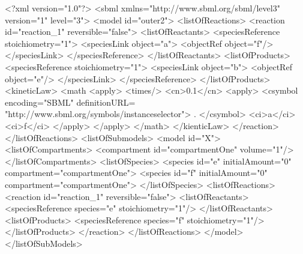 \documentclass{cekarticle}
\begin{document}
\begin{example}
<?xml version="1.0"?>
<sbml xmlns="http://www.sbml.org/sbml/level3" version="1" level="3">
    <model id="outer2">
        <listOfReactions>
            <reaction id="reaction_1" reversible="false">
                <listOfReactants>
                    <speciesReference stoichiometry="1">
                        <speciesLink object="a">
                            <objectRef object="f"/>
                        </speciesLink>
                    </speciesReference>
                </listOfReactants>
                <listOfProducts>
                    <speciesReference stoichiometry="1">
                        <speciesLink object="b">
                            <objectRef object="e"/>
                        </speciesLink>
                    </speciesReference>
                </listOfProducts>
                <kineticLaw>
                    <math 
                        <apply>
                            <times/>
                            <cn>0.1</cn>
                            <apply>
                                <csymbol
                                    encoding="SBML" 
                                    definitionURL=
                                        "http://www.sbml.org/symbols/instanceselector">
                                    .
                                </csymbol>
                                <ci>a</ci>
                                <ci>f</ci>
                            </apply>
                        </apply>    
                    </math>
                </kienticLaw>
            </reaction>
        </listOfReactions>
        <listOfSubmodels>
            <model id="X">
                <listOfCompartments>
                    <compartment id="compartmentOne" volume="1"/>
                </listOfCompartments>
                <listOfSpecies>
                    <species id="e" initialAmount="0" compartment="compartmentOne">
                    <species id="f" initialAmount="0" compartment="compartmentOne">
                </listOfSpecies>
                <listOfReactions>
                    <reaction id="reaction_1" reversible="false">
                        <listOfReactants>
                            <speciesReference species="e" stoichiometry="1"/>
                        </listOfReactants>
                        <listOfProducts>
                            <speciesReference species="f" stoichiometry="1"/>
                        </listOfProducts>
                    </reaction>
                </listOfReactions>
            </model>
        </listOfSubModels>

\end{example}
\end{document}
